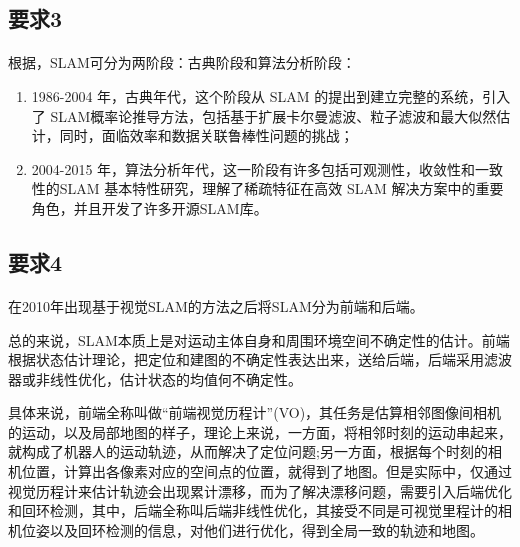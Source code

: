 \documentclass[40pt,a4paper，UTF8]{ctexart}
\begin{document}
\paragraph{}

\subsection{要求3} 
\paragraph{}
根据\cite{ref1}，SLAM可分为两阶段：古典阶段和算法分析阶段：
\begin{enumerate}
\item 1986-2004 年，古典年代，这个阶段从 SLAM 的提出到建立完整的系统，引入了 SLAM概率论推导方法，包括基于扩展卡尔曼滤波、粒子滤波和最大似然估计，同时，面临效率和数据关联鲁棒性问题的挑战；
\item 2004-2015 年，算法分析年代，这一阶段有许多包括可观测性，收敛性和一致性的SLAM 基本特性研究，理解了稀疏特征在高效 SLAM 解决方案中的重要角色，并且开发了许多开源SLAM库。
\end{enumerate}
\paragraph{}

\subsection{要求4} 
\paragraph{}

  在2010年出现基于视觉SLAM的方法之后将SLAM分为前端和后端。


总的来说，SLAM本质上是对运动主体自身和周围环境空间不确定性的估计。前端根据状态估计理论，把定位和建图的不确定性表达出来，送给后端，后端采用滤波器或非线性优化，估计状态的均值何不确定性。


具体来说，前端全称叫做“前端视觉历程计”(VO)，其任务是估算相邻图像间相机的运动，以及局部地图的样子，理论上来说，一方面，将相邻时刻的运动串起来，就构成了机器人的运动轨迹，从而解决了定位问题;另一方面，根据每个时刻的相机位置，计算出各像素对应的空间点的位置，就得到了地图。但是实际中，仅通过视觉历程计来估计轨迹会出现累计漂移，而为了解决漂移问题，需要引入后端优化和回环检测，其中，后端全称叫后端非线性优化，其接受不同是可视觉里程计的相机位姿以及回环检测的信息，对他们进行优化，得到全局一致的轨迹和地图。
\end{document}
